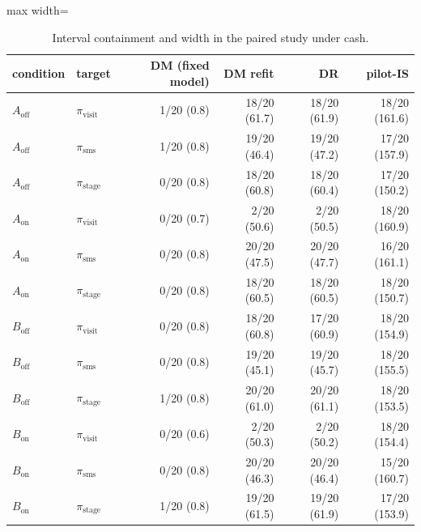 \begin{table}[!htbp]
\centering
\caption{Interval containment and width in the paired study under cash.}
\label{tab:campaignintervals_cash}
\footnotesize
\begin{adjustbox}{max width=\linewidth}
\begin{tabular}{llrrrr}
\toprule
condition & target & DM (fixed model) & DM refit & DR & pilot-IS \\
\midrule
$A_{\mathrm{off}}$ & $\pi_{\mathrm{visit}}$ & 1/20 (0.8) & 18/20 (61.7) & 18/20 (61.9) & 18/20 (161.6) \\
$A_{\mathrm{off}}$ & $\pi_{\mathrm{sms}}$ & 1/20 (0.8) & 19/20 (46.4) & 19/20 (47.2) & 17/20 (157.9) \\
$A_{\mathrm{off}}$ & $\pi_{\mathrm{stage}}$ & 0/20 (0.8) & 18/20 (60.8) & 18/20 (60.4) & 17/20 (150.2) \\
$A_{\mathrm{on}}$ & $\pi_{\mathrm{visit}}$ & 0/20 (0.7) & 2/20 (50.6) & 2/20 (50.5) & 18/20 (160.9) \\
$A_{\mathrm{on}}$ & $\pi_{\mathrm{sms}}$ & 0/20 (0.8) & 20/20 (47.5) & 20/20 (47.7) & 16/20 (161.1) \\
$A_{\mathrm{on}}$ & $\pi_{\mathrm{stage}}$ & 0/20 (0.8) & 18/20 (60.5) & 18/20 (60.5) & 18/20 (150.7) \\
$B_{\mathrm{off}}$ & $\pi_{\mathrm{visit}}$ & 0/20 (0.8) & 18/20 (60.8) & 17/20 (60.9) & 18/20 (154.9) \\
$B_{\mathrm{off}}$ & $\pi_{\mathrm{sms}}$ & 0/20 (0.8) & 19/20 (45.1) & 19/20 (45.7) & 18/20 (155.5) \\
$B_{\mathrm{off}}$ & $\pi_{\mathrm{stage}}$ & 1/20 (0.8) & 20/20 (61.0) & 20/20 (61.1) & 18/20 (153.5) \\
$B_{\mathrm{on}}$ & $\pi_{\mathrm{visit}}$ & 0/20 (0.6) & 2/20 (50.3) & 2/20 (50.2) & 18/20 (154.4) \\
$B_{\mathrm{on}}$ & $\pi_{\mathrm{sms}}$ & 0/20 (0.8) & 20/20 (46.3) & 20/20 (46.4) & 15/20 (160.7) \\
$B_{\mathrm{on}}$ & $\pi_{\mathrm{stage}}$ & 1/20 (0.8) & 19/20 (61.5) & 19/20 (61.9) & 17/20 (153.9) \\
\bottomrule
\end{tabular}
\end{adjustbox}
\end{table}
